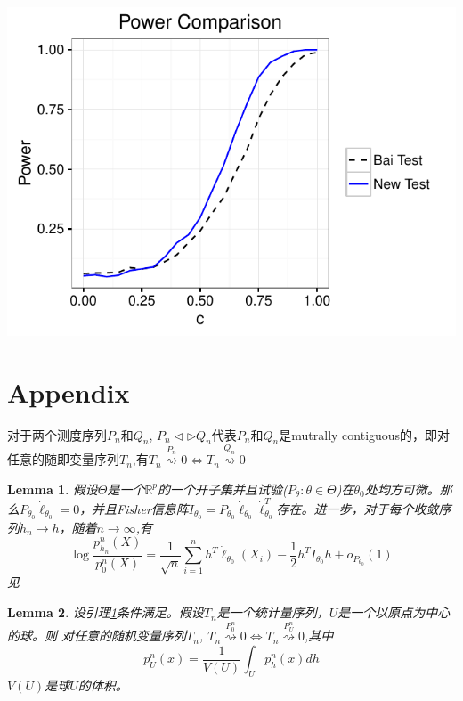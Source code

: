 \documentclass[review]{elsarticle}
\newtheorem{lemma}{Lemma}
\begin{document}
\includegraphics{myPowerFigure.pdf}



\section{Appendix}
对于两个测度序列$P_n$和$Q_n$, $P_n\triangleleft \triangleright Q_n$代表$P_n$和$Q_n$是mutrally contiguous的，即对任意的随即变量序列$T_n$,有$T_n\overset{P_n}{\rightsquigarrow}0\Leftrightarrow T_n\overset{Q_n}{\rightsquigarrow}0$
\begin{lemma}\label{lemmaEx}
    假设$\Theta$是一个$\mathbb{R}^p$的一个开子集并且试验($P_\theta: \theta \in\Theta$)在$\theta_0$处均方可微。那么$P_{\theta_0}\dot{\ell}_{\theta_0}=0$，并且Fisher信息阵$I_{\theta_0}=P_{\theta_0}\dot{\ell}_{\theta_0}\dot{\ell}_{\theta_0}^T$存在。进一步，对于每个收敛序列$h_n\to h$，随着$n\to \infty$,有
    \begin{equation}
        \log \frac{p^n_{h_n}(X)}{p^n_0(X)}=\frac{1}{\sqrt{n}}\sum^n_{i=1}h^T\dot{\ell}_{\theta_0}(X_i)-\frac{1}{2}h^TI_{\theta_0}h+o_{P_{\theta_0}}(1)
    \end{equation}
    见\cite{van2000asymptotic}
\end{lemma}



\begin{lemma}\label{lemmaContiguity}
    设引理\ref{lemmaEx}条件满足。假设$T_n$是一个统计量序列，$U$是一个以原点为中心的球。则
    对任意的随机变量序列$T_n$, $T_n\overset{P^n_0}{\rightsquigarrow}0\Leftrightarrow T_n\overset{P^n_U}{\rightsquigarrow}0$,其中
\begin{equation}
    p^n_U(x)=\frac{1}{V(U)}\int_{U}p_h^n(x)dh
\end{equation}
$V(U)$是球$U$的体积。
\end{lemma}
\end{document}
